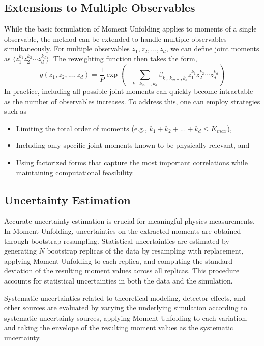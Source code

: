     \subsection{Extensions to Multiple Observables}
        While the basic formulation of Moment Unfolding applies to moments of a single observable, the method can be extended to handle multiple observables simultaneously.
        For multiple observables $z_1, z_2, ..., z_d$, we can define joint moments as \(\langle z_1^{k_1} z_2^{k_2} \cdots z_d^{k_d} \rangle.\)
        The reweighting function then takes the form,
        \[
            g(z_1, z_2, ..., z_d) = \frac{1}{P}\exp\left(-\sum_{k_1, k_2, ..., k_d} \beta_{k_1, k_2, ..., k_d} z_1^{k_1} z_2^{k_2} \cdots z_d^{k_d}\right)
        \]
        In practice, including all possible joint moments can quickly become intractable as the number of observables increases.
        To address this, one can employ strategies such as
        \begin{itemize}
            \item Limiting the total order of moments (e.g., $k_1 + k_2 + ... + k_d \leq K_{max}$),
            \item Including only specific joint moments known to be physically relevant, and
            \item Using factorized forms that capture the most important correlations while maintaining computational feasibility.
        \end{itemize}
    \subsection{Uncertainty Estimation}
        Accurate uncertainty estimation is crucial for meaningful physics measurements.
        In Moment Unfolding, uncertainties on the extracted moments are obtained through bootstrap resampling.
        Statistical uncertainties are estimated by generating $N$ bootstrap replicas of the data by resampling with replacement,
        applying Moment Unfolding to each replica, and
        computing the standard deviation of the resulting moment values across all replicas.
        This procedure accounts for statistical uncertainties in both the data and the simulation.
        
        Systematic uncertainties related to theoretical modeling, detector effects, and other sources are evaluated by
        varying the underlying simulation according to systematic uncertainty sources, applying Moment Unfolding to each variation, and
        taking the envelope of the resulting moment values as the systematic uncertainty.

